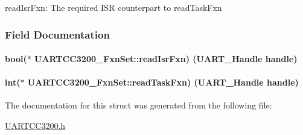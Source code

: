 read\+Isr\+Fxn\+: The required I\+S\+R counterpart to read\+Task\+Fxn 

\subsubsection{Field Documentation}
\paragraph[{read\+Isr\+Fxn}]{\setlength{\rightskip}{0pt plus 5cm}bool($\ast$ U\+A\+R\+T\+C\+C3200\+\_\+\+Fxn\+Set\+::read\+Isr\+Fxn) ({\bf U\+A\+R\+T\+\_\+\+Handle} handle)}\label{struct_u_a_r_t_c_c3200___fxn_set_a0d200081d3162b633713932b690715ec}
\paragraph[{read\+Task\+Fxn}]{\setlength{\rightskip}{0pt plus 5cm}int($\ast$ U\+A\+R\+T\+C\+C3200\+\_\+\+Fxn\+Set\+::read\+Task\+Fxn) ({\bf U\+A\+R\+T\+\_\+\+Handle} handle)}\label{struct_u_a_r_t_c_c3200___fxn_set_a3d26844b797b84de34663d7c70f1a2fa}


The documentation for this struct was generated from the following file\+:\begin{DoxyCompactItemize}
\item 
\hyperlink{_u_a_r_t_c_c3200_8h}{U\+A\+R\+T\+C\+C3200.\+h}\end{DoxyCompactItemize}
